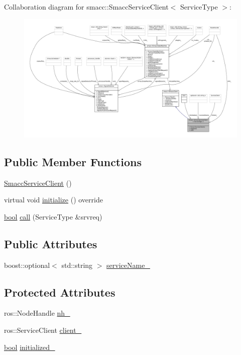 Collaboration diagram for smacc\+:\+:Smacc\+Service\+Client$<$ Service\+Type $>$\+:
\nopagebreak
\begin{figure}[H]
\begin{center}
\leavevmode
\includegraphics[width=350pt]{classsmacc_1_1SmaccServiceClient__coll__graph}
\end{center}
\end{figure}
\subsection*{Public Member Functions}
\begin{DoxyCompactItemize}
\item 
\hyperlink{classsmacc_1_1SmaccServiceClient_a54f6b9cd746c3e6c604afa1c93b990fd}{Smacc\+Service\+Client} ()
\item 
virtual void \hyperlink{classsmacc_1_1SmaccServiceClient_a9ac26f1ca1e661e6b393ce7605166bdc}{initialize} () override
\item 
\hyperlink{classbool}{bool} \hyperlink{classsmacc_1_1SmaccServiceClient_a1b749ce13f3cb1dbf10a5992c05c173e}{call} (Service\+Type \&srvreq)
\end{DoxyCompactItemize}
\subsection*{Public Attributes}
\begin{DoxyCompactItemize}
\item 
boost\+::optional$<$ std\+::string $>$ \hyperlink{classsmacc_1_1SmaccServiceClient_a93cf1653e9d7a0f4aa25dbb8ae7d07fc}{service\+Name\+\_\+}
\end{DoxyCompactItemize}
\subsection*{Protected Attributes}
\begin{DoxyCompactItemize}
\item 
ros\+::\+Node\+Handle \hyperlink{classsmacc_1_1SmaccServiceClient_a6e5e8b77b4c7137f9c820b09c8f661b5}{nh\+\_\+}
\item 
ros\+::\+Service\+Client \hyperlink{classsmacc_1_1SmaccServiceClient_a6eed795ca67ec50096a9e5695d4281c6}{client\+\_\+}
\item 
\hyperlink{classbool}{bool} \hyperlink{classsmacc_1_1SmaccServiceClient_a251b147a783f05d13edb272b85f64982}{initialized\+\_\+}
\end{DoxyCompactItemize}


